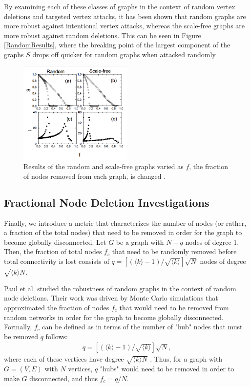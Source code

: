 \documentclass[doc]{apa}%
\begin{document}
By examining each of these classes of graphs in the context of random vertex deletions and targeted vertex attacks, it has been shown that random graphs are more robust against intentional vertex attacks, whereas the scale-free graphs are more robust against random deletions. This can be seen in Figure \ref{RandomResults}, where the breaking point of the largest component of the graphs $S$ drops off quicker for random graphs when attacked randomly \cite{GraphThesis}. 

\begin{figure}[h!]
	\label{fig:RandomResults}
	\centering
		\includegraphics[width=0.5\textwidth]{random_results.png}
	\caption{Results of the random and scale-free graphs varied as $f$, the fraction of nodes removed from each graph, is changed . } %
\end{figure}

\subsection{Fractional Node Deletion Investigations}

Finally, we introduce a metric that characterizes the number of nodes (or rather, a fraction of the total nodes) that need to be removed in order for the graph to become globally disconnected. Let $G$ be a graph with $N - q$ nodes of degree $1$. Then, the fraction of total nodes $f_c$ that need to be randomly removed before total connectivity is lost consists of $q = [(\langle k \rangle - 1) / \sqrt{\langle k \rangle}]\sqrt{N}$ nodes of degree $\sqrt{\langle k \rangle N}$. 

Paul et al. studied the robustness of random graphs in the context of random node deletions. Their work was driven by Monte Carlo simulations that approximated the fraction of nodes $f_c$ that would need to be removed from random networks in order for the graph to become globally disconnected. Formally, $f_c$ can be defined as in terms of the number of "hub" nodes that must be removed $q$ follows:
\begin{eqnarray*}
q = \left[(\langle k \rangle - 1) / \sqrt{\langle k \rangle}\right]\sqrt{N},
\end{eqnarray*}
where each of these vertices have degree $\sqrt{\langle k \rangle N}$ \cite{asd}. Thus, for a graph with $G = (V,E)$ with $N$ vertices, $q$ "hubs" would need to be removed in order to make $G$ disconnected, and thus $f_c = q/N$.
\end{document}
